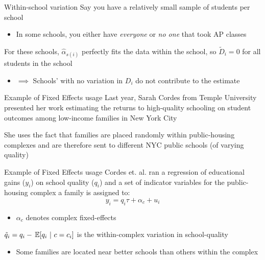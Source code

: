 \documentclass[aspectratio=169,t,11pt,table]{beamer}
\begin{document}
\begin{frame}{Within-school variation}
  Say you have a relatively small sample of students per school
  \begin{itemize}
    \item In some schools, you either have \emph{everyone} or \emph{no one} that took AP classes
  \end{itemize}  

  \pause
  \bigskip
  For these schools, $\hat{\alpha}_{s(i)}$ perfectly fits the data within the school, so $\tilde{D}_i = 0$ for all students in the school

  \pause
  \begin{itemize}
    \item[] $\implies$ Schools' with no variation in $D_i$ do not contribute to the estimate
  \end{itemize}
\end{frame}

\begin{frame}{Example of Fixed Effects usage}
  Last year, Sarah Cordes from Temple University presented her work estimating the returns to high-quality schooling on student outcomes among low-income families in New York City

  \bigskip
  She uses the fact that families are placed randomly within public-housing complexes and are therefore sent to different NYC public schools (of varying quality)
\end{frame}

\begin{frame}{Example of Fixed Effects usage}
  Cordes et. al. ran a regression of educational gains ($y_i$) on school quality ($q_i$) and a set of indicator variables for the public-housing complex a family is assigned to:
  $$
    y_i = q_i \tau + \alpha_c + u_i
  $$

  \begin{itemize}
    \item $\alpha_c$ denotes complex fixed-effects
  \end{itemize}  

  \pause
  \bigskip 
  $\tilde{q}_i = q_i - \expec{q_i}{c = c_i}$ is the within-complex variation in school-quality
  \begin{itemize}
    \item Some families are located near better schools than others within the complex
  \end{itemize}
\end{frame}
\end{document}
